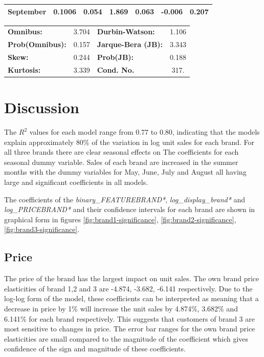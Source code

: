 \documentclass[a4paper,11pt]{article}
\begin{document}
\begin{center}
\begin{tabular}{lcccccc}
\textbf{September}             &       0.1006  &        0.054     &     1.869  &         0.063        &       -0.006    &        0.207     \\
\bottomrule
\end{tabular}
\begin{tabular}{lclc}
\textbf{Omnibus:}       &  3.704 & \textbf{  Durbin-Watson:     } &    1.106  \\
\textbf{Prob(Omnibus):} &  0.157 & \textbf{  Jarque-Bera (JB):  } &    3.343  \\
\textbf{Skew:}          &  0.244 & \textbf{  Prob(JB):          } &    0.188  \\
\textbf{Kurtosis:}      &  3.339 & \textbf{  Cond. No.          } &     317.  \\
\bottomrule
\end{tabular}
\end{center}
\newpage

\section{Discussion}

The $R^2$ values for each model range from 0.77 to 0.80, indicating that the models explain approximately 80\% of the variation in log unit sales for each brand. For all three brands there are clear seasonal effects on The coefficients for each seasonal dummy variable. Sales of each brand are increased in the summer months with the dummy variables for May, June, July and August all having large and significant coefficients in all models.

The coefficients of the \textit{binary\_FEATUREBRAND*}, \textit{log\_display\_brand*} and \textit{log\_PRICEBRAND*} and their confidence intervals for each brand are shown in graphical form in figures \ref{fig:brand1-significance}, \ref{fig:brand2-significance}, \ref{fig:brand3-significance}.

\subsection{Price}

The price of the brand has the largest impact on unit sales. The own brand price elasticities of brand 1,2 and 3 are -4.874, -3.682, -6.141 respectively. Due to the log-log form of the model, these coefficients can be interpreted as meaning that a decrease in price by 1\% will increase the unit sales by 4.874\%, 3.682\% and 6.141\% for each brand respectively. This suggests that customers of brand 3 are most sensitive to changes in price. The error bar ranges for the own brand price elasticities are small compared to the magnitude of the coefficient which gives confidence of the sign and magnitude of these coefficients.
\end{document}
